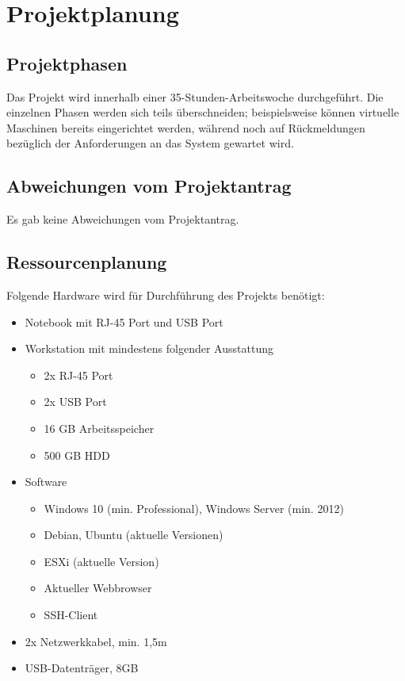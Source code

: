 \section{Projektplanung} 
\label{sec:Projektplanung}

\subsection{Projektphasen}
\label{sec:Projektphasen}
Das Projekt wird innerhalb einer 35-Stunden-Arbeitswoche durchgeführt. Die einzelnen Phasen werden sich teils überschneiden; beispielsweise können virtuelle Maschinen bereits
eingerichtet werden, während noch auf Rückmeldungen bezüglich der Anforderungen an das System gewartet wird. 

\subsection{Abweichungen vom Projektantrag}
\label{sec:AbweichungenProjektantrag}
Es gab keine Abweichungen vom Projektantrag.

\subsection{Ressourcenplanung}
\label{sec:Ressourcenplanung}
Folgende Hardware wird für Durchführung des Projekts benötigt:
\begin{itemize}
  \item Notebook mit RJ-45 Port und USB Port
  \item Workstation mit mindestens folgender Ausstattung
  \begin{itemize}
    \item 2x RJ-45 Port
    \item 2x USB Port
    \item 16 GB Arbeitsspeicher
    \item 500 GB HDD
  \end{itemize}
  \item Software
  \begin{itemize}
    \item Windows 10 (min. Professional), Windows Server (min. 2012)
    \item Debian, Ubuntu (aktuelle Versionen)
    \item ESXi (aktuelle Version)
    \item Aktueller Webbrowser
    \item SSH-Client
  \end{itemize}
  \item 2x Netzwerkkabel, min. 1,5m
  \item USB-Datenträger, 8GB
\end{itemize}
